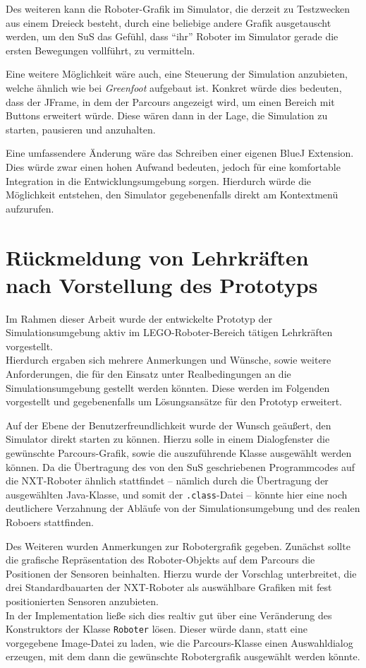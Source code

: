 \documentclass[paper=a4, DIV=calc, BCOR=15mm, twoside=on, onecolumn=on, open = right, titlepage =on, parskip =half, headsepline = on, footsepline = on, chapterprefix = off, appendixprefix = off, fontsize = 12pt, numbers = noenddot, abstract = on]{scrbook}
\begin{document}
Des weiteren kann die Roboter-Grafik im Simulator, die derzeit zu Testzwecken aus einem Dreieck besteht, durch eine beliebige andere Grafik ausgetauscht werden, um den SuS das Gefühl, dass "`ihr"' Roboter im Simulator gerade die ersten Bewegungen vollführt, zu vermitteln.

Eine weitere Möglichkeit wäre auch, eine Steuerung der Simulation anzubieten, welche ähnlich wie bei \emph{Greenfoot} aufgebaut ist. Konkret würde dies bedeuten, dass der JFrame, in dem der Parcours angezeigt wird, um einen Bereich mit Buttons erweitert würde. Diese wären dann in der Lage, die Simulation zu starten, pausieren und anzuhalten.

Eine umfassendere Änderung wäre das Schreiben einer eigenen BlueJ Extension. Dies würde zwar einen hohen Aufwand bedeuten, jedoch für eine komfortable Integration in die Entwicklungsumgebung sorgen. Hierdurch würde die Möglichkeit entstehen, den Simulator gegebenenfalls direkt am Kontextmenü aufzurufen.

\section{Rückmeldung von Lehrkräften nach Vorstellung des Prototyps}

Im Rahmen dieser Arbeit wurde der entwickelte Prototyp der Simulationsumgebung aktiv im \textsc{LEGO}-Roboter-Bereich tätigen Lehrkräften vorgestellt.\\
Hierdurch ergaben sich mehrere Anmerkungen und Wünsche, sowie weitere Anforderungen, die für den Einsatz unter Realbedingungen an die Simulationsumgebung gestellt werden könnten. Diese werden im Folgenden vorgestellt und gegebenenfalls um Lösungsansätze für den Prototyp erweitert.

Auf der Ebene der Benutzerfreundlichkeit wurde der Wunsch geäußert, den Simulator direkt starten zu können. Hierzu solle in einem Dialogfenster die gewünschte Parcours-Grafik, sowie die auszuführende Klasse ausgewählt werden können. Da die Übertragung des von den SuS geschriebenen Programmcodes auf die NXT-Roboter ähnlich stattfindet -- nämlich durch die Übertragung der ausgewählten Java-Klasse, und somit der \texttt{.class}-Datei -- könnte hier eine noch deutlichere Verzahnung der Abläufe von der Simulationsumgebung und des realen Roboers stattfinden.

Des Weiteren wurden Anmerkungen zur Robotergrafik gegeben. Zunächst sollte die grafische Repräsentation des Roboter-Objekts auf dem Parcours die Positionen der Sensoren beinhalten. Hierzu wurde der Vorschlag unterbreitet, die drei Standardbauarten der NXT-Roboter als auswählbare Grafiken mit fest positionierten Sensoren anzubieten.\\
In der Implementation ließe sich dies realtiv gut über eine Veränderung des Konstruktors der Klasse \texttt{Roboter} lösen. Dieser würde dann, statt eine vorgegebene Image-Datei zu laden, wie die Parcours-Klasse einen Auswahldialog erzeugen, mit dem dann die gewünschte Robotergrafik ausgewählt werden könnte.
\end{document}
